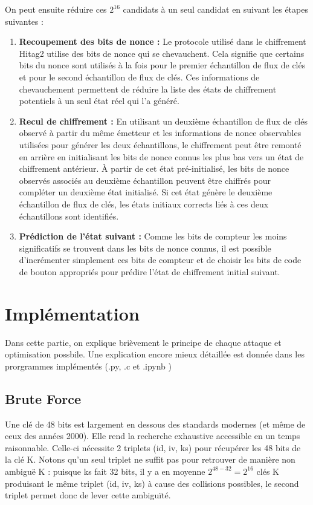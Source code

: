 \documentclass{template}
\begin{document}
On peut ensuite réduire ces $2^{16}$ candidats à un seul candidat en suivant les étapes suivantes :

\begin{enumerate}
    \item \textbf{Recoupement des bits de nonce :} Le protocole utilisé dans le chiffrement Hitag2 utilise des bits de nonce qui se chevauchent. Cela signifie que certains bits du nonce sont utilisés à la fois pour le premier échantillon de flux de clés et pour le second échantillon de flux de clés. Ces informations de chevauchement permettent de réduire la liste des états de chiffrement potentiels à un seul état réel qui l'a généré.
    
    \item \textbf{Recul de chiffrement :} En utilisant un deuxième échantillon de flux de clés observé à partir du même émetteur et les informations de nonce observables utilisées pour générer les deux échantillons, le chiffrement peut être remonté en arrière en initialisant les bits de nonce connus les plus bas vers un état de chiffrement antérieur. À partir de cet état pré-initialisé, les bits de nonce observés associés au deuxième échantillon peuvent être chiffrés pour compléter un deuxième état initialisé. Si cet état génère le deuxième échantillon de flux de clés, les états initiaux corrects liés à ces deux échantillons sont identifiés.
    
    \item \textbf{Prédiction de l'état suivant :} Comme les bits de compteur les moins significatifs se trouvent dans les bits de nonce connus, il est possible d'incrémenter simplement ces bits de compteur et de choisir les bits de code de bouton appropriés pour prédire l'état de chiffrement initial suivant.
\end{enumerate}
\chapter{Implémentation}
Dans cette partie, on explique brièvement le principe de chaque attaque et optimisation possbile.
Une explication encore mieux détaillée est donnée dans les prorgrammes implémentés (.py, .c et .ipynb )
\section{Brute Force}
\baselineskip=16pt
Une clé de 48 bits est largement en dessous des standards modernes (et même de ceux des années 2000). Elle rend la recherche exhaustive accessible en un temps raisonnable. Celle-ci nécessite 2 triplets (id, iv, ks) pour récupérer les 48 bits de la clé K. Notons qu'un seul triplet ne suffit pas pour retrouver de manière non ambiguë K : puisque ks fait 32 bits, il y a en moyenne $2^{48-32} = 2^{16}$ clés K produisant le même triplet (id, iv, ks) à cause des collisions possibles, le second triplet permet donc de lever cette ambiguïté.
\end{document}
